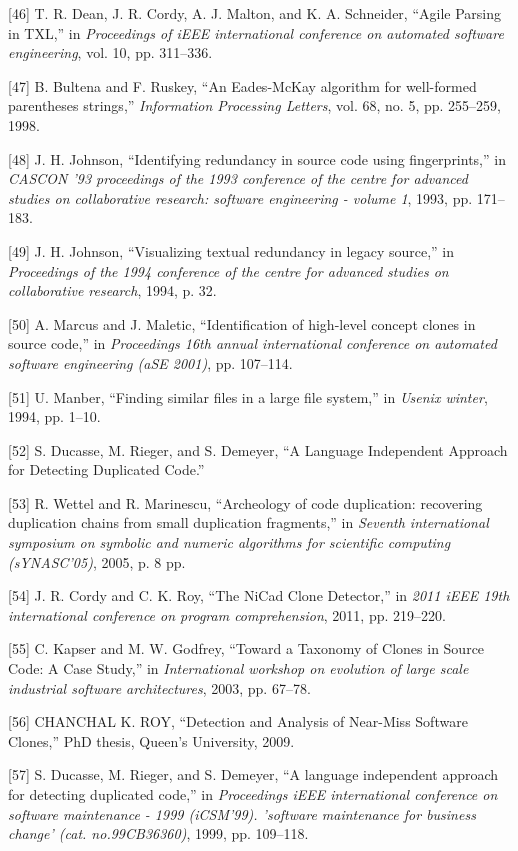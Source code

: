 \documentclass[conference]{IEEEtran}
\begin{document}
{[}46{]} T. R. Dean, J. R. Cordy, A. J. Malton, and K. A. Schneider,
``Agile Parsing in TXL,'' in \emph{Proceedings of iEEE international
conference on automated software engineering}, vol. 10, pp. 311--336.

{[}47{]} B. Bultena and F. Ruskey, ``An Eades-McKay algorithm for
well-formed parentheses strings,'' \emph{Information Processing
Letters}, vol. 68, no. 5, pp. 255--259, 1998.

{[}48{]} J. H. Johnson, ``Identifying redundancy in source code using
fingerprints,'' in \emph{CASCON '93 proceedings of the 1993 conference
of the centre for advanced studies on collaborative research: software
engineering - volume 1}, 1993, pp. 171--183.

{[}49{]} J. H. Johnson, ``Visualizing textual redundancy in legacy
source,'' in \emph{Proceedings of the 1994 conference of the centre for
advanced studies on collaborative research}, 1994, p. 32.

{[}50{]} A. Marcus and J. Maletic, ``Identification of high-level
concept clones in source code,'' in \emph{Proceedings 16th annual
international conference on automated software engineering (aSE 2001)},
pp. 107--114.

{[}51{]} U. Manber, ``Finding similar files in a large file system,'' in
\emph{Usenix winter}, 1994, pp. 1--10.

{[}52{]} S. Ducasse, M. Rieger, and S. Demeyer, ``A Language Independent
Approach for Detecting Duplicated Code.''

{[}53{]} R. Wettel and R. Marinescu, ``Archeology of code duplication:
recovering duplication chains from small duplication fragments,'' in
\emph{Seventh international symposium on symbolic and numeric algorithms
for scientific computing (sYNASC'05)}, 2005, p. 8 pp.

{[}54{]} J. R. Cordy and C. K. Roy, ``The NiCad Clone Detector,'' in
\emph{2011 iEEE 19th international conference on program comprehension},
2011, pp. 219--220.

{[}55{]} C. Kapser and M. W. Godfrey, ``Toward a Taxonomy of Clones in
Source Code: A Case Study,'' in \emph{International workshop on
evolution of large scale industrial software architectures}, 2003, pp.
67--78.

{[}56{]} CHANCHAL K. ROY, ``Detection and Analysis of Near-Miss Software
Clones,'' PhD thesis, Queen's University, 2009.

{[}57{]} S. Ducasse, M. Rieger, and S. Demeyer, ``A language independent
approach for detecting duplicated code,'' in \emph{Proceedings iEEE
international conference on software maintenance - 1999 (iCSM'99).
'software maintenance for business change' (cat. no.99CB36360)}, 1999,
pp. 109--118.
\end{document}
